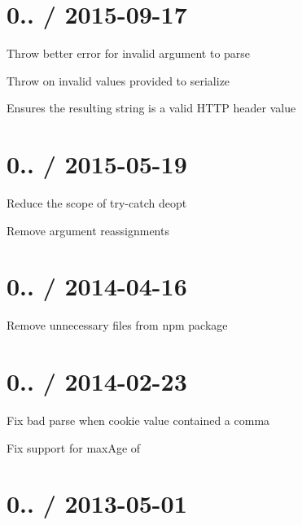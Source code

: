 \section*{0.. / 2015-\/09-\/17 }


\begin{DoxyItemize}
\item Throw better error for invalid argument to parse
\item Throw on invalid values provided to {\ttfamily serialize}
\begin{DoxyItemize}
\item Ensures the resulting string is a valid H\+T\+TP header value
\end{DoxyItemize}
\end{DoxyItemize}

\section*{0.. / 2015-\/05-\/19 }


\begin{DoxyItemize}
\item Reduce the scope of try-\/catch deopt
\item Remove argument reassignments
\end{DoxyItemize}

\section*{0.. / 2014-\/04-\/16 }


\begin{DoxyItemize}
\item Remove unnecessary files from npm package
\end{DoxyItemize}

\section*{0.. / 2014-\/02-\/23 }


\begin{DoxyItemize}
\item Fix bad parse when cookie value contained a comma
\item Fix support for {\ttfamily max\+Age} of {}
\end{DoxyItemize}

\section*{0.. / 2013-\/05-\/01 }


